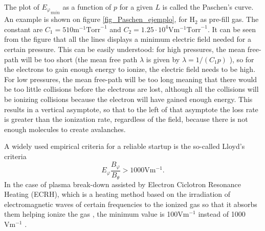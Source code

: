 \documentclass[a4paper,12pt,oneside]{book}
\begin{document}
The plot of ${E_\varphi}_{min}$ as a function of $p$ for a given $L$ is called the Paschen's curve. An example is shown on figure \ref{fig_Paschen_ejemplo}, for H$_2$ as pre-fill gas. The constant are $C_1=510 \text{m}^{-1} \text{Torr}^{-1}$ and $C_2=1.25 \cdot 10^4 \text{V} \text{m}^{-1} \text{Torr}^{-1}$. It can be seen from the figure that all the lines displays a minimum electric field needed for a certain pressure. This can be easily understood: for high pressures, the mean free-path will be too short (the mean free path $\lambda$ is given by $\lambda=1/(C_1 p)$ \cite{KimThesis}), so for the electrons to gain enough energy to ionize, the electric field needs to be high. For low pressures, the mean free-path will be too long meaning that there would be too little collisions before the electrons are lost, although all the collisions will be ionizing collisions because the electron will have gained enough energy. This results in a vertical asymptote, so that to the left of that asymptote the loss rate is greater than the ionization rate, regardless of the field, because there is not enough molecules to create avalanches.

A widely used empirical criteria for a reliable startup is the so-called Lloyd's criteria \cite{ITER_1999}
%
\begin{equation}
E_\varphi \dfrac{B_\varphi}{B_\theta} >1000 \text{V}\text{m}^{-1}.
\end{equation}
In the case of plasma break-down assisted by Electron Ciclotron Resonance Heating (ECRH), which is a heating method based on the irradiation of electromagnetic waves of certain frequencies to the ionized gas so that it absorbs them helping ionize the gas \cite{ITER_2019}, the minimum value is 100$\text{V}\text{m}^{-1}$ instead of 1000$\text{V}\text{m}^{-1}$ \cite{VEST_2015}.
\end{document}
